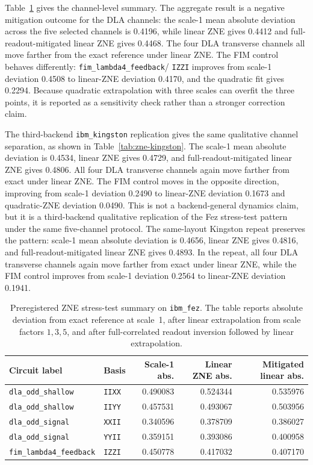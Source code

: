 \documentclass[preprint,aps,physrev,superscriptaddress,floatfix,longbibliography]{revtex4-2}
\begin{document}
Table~\ref{tab:zne} gives the channel-level summary. The aggregate result is a
negative mitigation outcome for the DLA channels: the scale-1 mean absolute
deviation across the five selected channels is 0.4196, while linear ZNE gives
0.4412 and full-readout-mitigated linear ZNE gives 0.4468. The four DLA
transverse channels all move farther from the exact reference under linear
ZNE. The FIM control behaves differently: \texttt{fim\_lambda4\_feedback}/
\texttt{IZZI} improves from scale-1 deviation 0.4508 to linear-ZNE deviation
0.4170, and the quadratic fit gives 0.2294. Because quadratic extrapolation
with three scales can overfit the three points, it is reported as a sensitivity
check rather than a stronger correction claim.

The third-backend \texttt{ibm\_kingston} replication gives the same qualitative
channel separation, as shown in Table~\ref{tab:zne-kingston}. The scale-1 mean
absolute deviation is 0.4534, linear ZNE gives 0.4729, and
full-readout-mitigated linear ZNE gives 0.4806. All four DLA transverse
channels again move farther from exact under linear ZNE. The FIM control moves
in the opposite direction, improving from scale-1 deviation 0.2490 to
linear-ZNE deviation 0.1673 and quadratic-ZNE deviation 0.0490. This is not a
backend-general dynamics claim, but it is a third-backend qualitative
replication of the Fez stress-test pattern under the same five-channel
protocol. The same-layout Kingston repeat preserves the pattern: scale-1 mean
absolute deviation is 0.4656, linear ZNE gives 0.4816, and
full-readout-mitigated linear ZNE gives 0.4893. In the repeat, all four DLA
transverse channels again move farther from exact under linear ZNE, while the
FIM control improves from scale-1 deviation 0.2564 to linear-ZNE deviation
0.1941.

\begin{table}[tb]
\centering
\small
\begin{tabular}{llrrr}
\toprule
Circuit label & Basis & Scale-1 abs. & Linear ZNE abs. & Mitigated linear abs. \\
\midrule
\texttt{dla\_odd\_shallow} & \texttt{IIXX} & 0.490083 & 0.524344 & 0.535976 \\
\texttt{dla\_odd\_shallow} & \texttt{IIYY} & 0.457531 & 0.493067 & 0.503956 \\
\texttt{dla\_odd\_signal} & \texttt{XXII} & 0.340596 & 0.378709 & 0.386027 \\
\texttt{dla\_odd\_signal} & \texttt{YYII} & 0.359151 & 0.393086 & 0.400958 \\
\texttt{fim\_lambda4\_feedback} & \texttt{IZZI} & 0.450778 & 0.417032 & 0.407170 \\
\bottomrule
\end{tabular}
\caption{Preregistered ZNE stress-test summary on \texttt{ibm\_fez}. The
table reports absolute deviation from exact reference at scale~1, after
linear extrapolation from scale factors $1,3,5$, and after full-correlated
readout inversion followed by linear extrapolation.}
\label{tab:zne}
\end{table}
\end{document}

